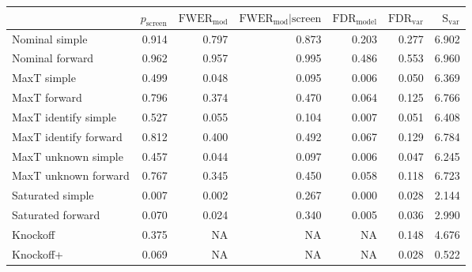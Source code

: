 
\renewcommand{\guarantee}[1]{{\color{blue} #1}}
\begin{tabular}{lrrrrrr}
\toprule
{} &  $p_{\text{screen}}$ &  $\text{FWER}_{\text{mod}}$ &  $\text{FWER}_{\text{mod}} \vert \text{screen}$ &  $\text{FDR}_{\text{model}}$ &  $\text{FDR}_{\text{var}}$ &  $\text{S}_{\text{var}}$ \\ \midrule
Nominal simple & 0.914 & 0.797 & 0.873 & 0.203 & 0.277 & 6.902 \\ 
Nominal forward & 0.962 & 0.957 & 0.995 & 0.486 & 0.553 & 6.960 \\ 
MaxT simple & 0.499 & \guarantee{0.048} & \guarantee{0.095} & \guarantee{0.006} & 0.050 & 6.369 \\ 
MaxT forward & 0.796 & 0.374 & 0.470 & \guarantee{0.064} & 0.125 & 6.766 \\ 
MaxT identify simple & 0.527 & \guarantee{0.055} & \guarantee{0.104} & \guarantee{0.007} & 0.051 & 6.408 \\ 
MaxT identify forward & 0.812 & 0.400 & 0.492 & \guarantee{0.067} & 0.129 & 6.784 \\ 
MaxT unknown simple & 0.457 & \guarantee{0.044} & \guarantee{0.097} & \guarantee{0.006} & 0.047 & 6.245 \\ 
MaxT unknown forward & 0.767 & 0.345 & 0.450 & \guarantee{0.058} & 0.118 & 6.723 \\ 
Saturated simple & 0.007 & 0.002 & 0.267 & 0.000 & 0.028 & 2.144 \\ 
Saturated forward & 0.070 & 0.024 & 0.340 & 0.005 & 0.036 & 2.990 \\ 
Knockoff & 0.375 & NA & NA & NA & 0.148 & 4.676 \\ 
Knockoff+ & 0.069 & NA & NA & NA & \guarantee{0.028} & 0.522 \\  
\bottomrule
\end{tabular}